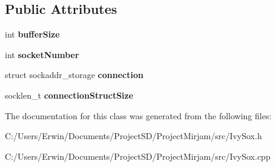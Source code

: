 \subsection*{Public Attributes}
\begin{DoxyCompactItemize}
\item 
\hypertarget{class_inbound_connection_a0252a8d8e67ee23cc918a5143a883eac}{}int {\bfseries buffer\+Size}\label{class_inbound_connection_a0252a8d8e67ee23cc918a5143a883eac}

\item 
\hypertarget{class_inbound_connection_abe59e235e714eeeb21e34496b047f90a}{}int {\bfseries socket\+Number}\label{class_inbound_connection_abe59e235e714eeeb21e34496b047f90a}

\item 
\hypertarget{class_inbound_connection_ad2f2ebe0e15b095319aa058377c92f8d}{}struct sockaddr\+\_\+storage {\bfseries connection}\label{class_inbound_connection_ad2f2ebe0e15b095319aa058377c92f8d}

\item 
\hypertarget{class_inbound_connection_a5bc8f0afff5e25441659b341ca231a32}{}socklen\+\_\+t {\bfseries connection\+Struct\+Size}\label{class_inbound_connection_a5bc8f0afff5e25441659b341ca231a32}

\end{DoxyCompactItemize}


The documentation for this class was generated from the following files\+:\begin{DoxyCompactItemize}
\item 
C\+:/\+Users/\+Erwin/\+Documents/\+Project\+S\+D/\+Project\+Mirjam/src/Ivy\+Sox.\+h\item 
C\+:/\+Users/\+Erwin/\+Documents/\+Project\+S\+D/\+Project\+Mirjam/src/Ivy\+Sox.\+cpp\end{DoxyCompactItemize}
